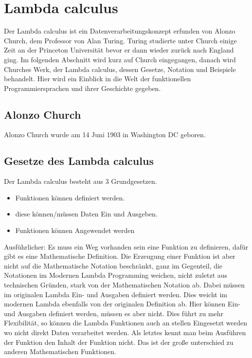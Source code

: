 \section{Lambda calculus}
Der Lambda calculus ist ein Datenverarbeitungskonzept erfunden von Alonzo Church, dem Professor von Alan Turing. Turing studierte unter Church einige Zeit an der Princeton Universität bevor er dann wieder zurück nach England ging. Im folgenden Abschnitt wird kurz auf Church eingegangen, danach wird Churches Werk, der Lambda calculus, dessen Gesetze, Notation und Beispiele behandelt. Hier wird ein Einblick in die Welt der funktionellen Programmiersprachen und ihrer Geschichte gegeben.
\subsection{Alonzo Church}
Alonzo Church wurde am 14 Juni 1903 in Washington DC geboren. \cite{lifechurch}
\subsection{Gesetze des Lambda calculus}
Der Lambda calculus besteht aus 3 Grundgesetzen.
\begin{itemize}
\item Funktionen können definiert werden.
\item diese können/müssen Daten Ein und Ausgeben.
\item Funktionen können Angewendet werden
\end{itemize}
Ausführlicher: Es muss ein Weg vorhanden sein eine Funktion zu definieren, dafür gibt es eine Mathematische Definition. Die Erzeugung einer Funktion ist aber nicht auf die Mathematische Notation beschränkt, ganz im Gegenteil, die Notationen im Modernen Lambda Programming weichen, nicht zuletzt aus technischen Gründen, stark von der Mathematischen Notation ab. Dabei müssen im originalen Lambda Ein- und Ausgaben definiert werden. Dies weicht im modernen Lambda ebenfalls von der originalen Definition ab. Hier können Ein- und Ausgaben definiert werden, müssen es aber nicht. Dies führt zu mehr Flexibilität, so können die Lambda Funktionen auch an stellen Eingesetzt werden wo nicht direkt Daten verarbeitet werden. Als letztes kennt man beim Ausführen der Funktion den Inhalt der Funktion nicht. Das ist der große unterschied zu anderen Mathematischen Funktionen.\cite{lambdacalculus}

